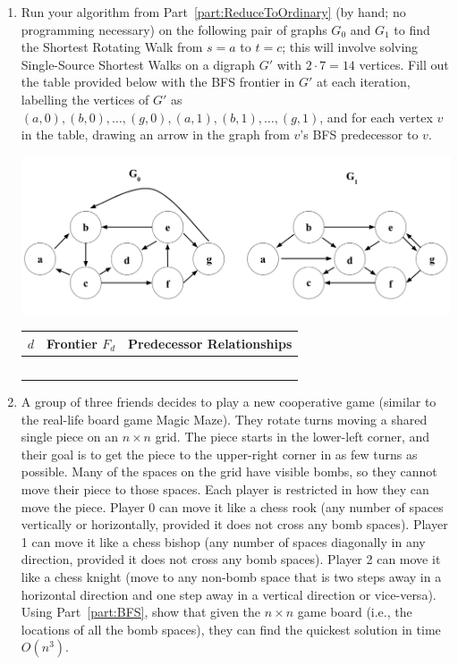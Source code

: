 \documentclass[11pt]{article}
\begin{document}
\begin{enumerate}
\begin{enumerate}
        
        
        \item \label{part:BFS} 
        Run your algorithm from Part~\ref{part:ReduceToOrdinary} (by hand; no programming necessary) on the following pair of graphs $G_0$ and $G_1$ to find the Shortest Rotating Walk from $s=a$ to $t=c$; this will involve solving Single-Source Shortest Walks on a digraph $G'$ with $2\cdot 7=14$ vertices. Fill out the table provided below with the BFS frontier in $G'$ at each iteration, labelling the vertices of $G'$ as $(a, 0),(b, 0),\ldots,(g,0),(a,1),(b,1),\ldots,(g,1)$, and for each vertex $v$ in the table, drawing an arrow in the graph from $v$'s BFS predecessor to $v$. 

            \includegraphics[width=14cm]{ps4_graphs_new.png}
        \begin{table}[ht]
        \centering
        \begin{tabular}{c|c|c}
            $d$ & Frontier $F_d$& Predecessor Relationships \\
            \hline
               & & \\
               & & \\
               & & \\
               & & \\
               & & \\
        \end{tabular}
        \end{table}
    \item 
        A group of three friends decides to play a new cooperative game (similar to the real-life board game Magic Maze).  They rotate turns moving a shared single piece on an $n\times n$ grid.  The piece starts in the lower-left corner, and their goal is to get the piece to the upper-right corner in as few turns as possible.  Many of the spaces on the grid have visible bombs, so they cannot move their piece to those spaces.  Each player is restricted in how they can move the piece.  Player 0 can move it like a chess rook (any number of spaces vertically or horizontally, provided it does not cross any bomb spaces). Player 1 can move it like a chess bishop (any number of spaces diagonally in any direction, provided it does not cross any bomb spaces).  Player 2 can move it like a chess knight (move to any non-bomb space that is two steps away in a horizontal direction and one step away in a vertical direction or vice-versa).   Using Part~\ref{part:BFS}, show that given the $n\times n$ game board (i.e., the locations of all the bomb spaces), they can find the quickest solution in time $O(n^3)$.  

\end{enumerate}
\end{enumerate}
\end{document}
